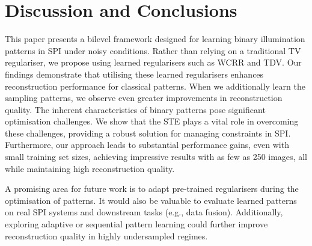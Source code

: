 \documentclass[lettersize,journal]{IEEEtran}
\begin{document}
\section{Discussion and Conclusions}\label{sec:conc}
This paper presents a bilevel framework designed for learning binary illumination patterns in SPI under noisy conditions. 
Rather than relying on a traditional TV regulariser, we propose using learned regularisers such as WCRR and TDV. 
Our findings demonstrate that utilising these learned regularisers enhances reconstruction performance for classical patterns. 
When we additionally learn the sampling patterns, we observe even greater improvements in reconstruction quality.
The inherent characteristics of binary patterns pose significant optimisation challenges. 
We show that the STE plays a vital role in overcoming these challenges, providing a robust solution for managing constraints in SPI. 
Furthermore, our approach leads to substantial performance gains, even with small training set sizes, achieving impressive results with as few as 250 images, all while maintaining high reconstruction quality.

A promising area for future work is to adapt pre-trained regularisers during the optimisation of patterns. 
It would also be valuable to evaluate learned patterns on real SPI systems and downstream tasks (e.g., data fusion).
Additionally, exploring adaptive or sequential pattern learning could further improve reconstruction quality in highly undersampled regimes.




\end{document}
